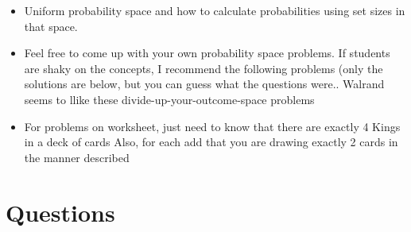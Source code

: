 \documentclass{exam}
\begin{document}
\begin{questions}
\begin{itemize}
\item Uniform probability space and how to calculate probabilities using set sizes in that space.
\item Feel free to come up with your own probability space problems. If students are shaky on the concepts, I recommend the following problems (only the solutions are below, but you can guess what the questions were.. Walrand seems to llike these divide-up-your-outcome-space problems
\item For problems on worksheet, just need to know that there are exactly 4 Kings in a deck of cards
Also, for each add that you are drawing exactly 2 cards in the manner described
\end{itemize}
\end{questions}

\section{Questions}
\end{document}
